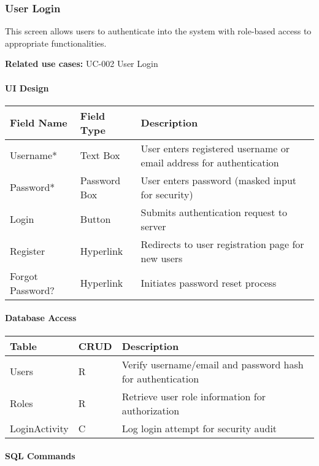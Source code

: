 \documentclass[12pt,a4paper]{article}
\begin{document}
\subsubsection{User Login}

This screen allows users to authenticate into the system with role-based access to appropriate functionalities.

\textbf{Related use cases:} UC-002 User Login

\paragraph{UI Design}

\begin{longtable}{|p{3cm}|p{3cm}|p{8cm}|}
\hline
\textbf{Field Name} & \textbf{Field Type} & \textbf{Description} \\
\hline
Username* & Text Box & User enters registered username or email address for authentication \\
\hline
Password* & Password Box & User enters password (masked input for security) \\
\hline
Login & Button & Submits authentication request to server \\
\hline
Register & Hyperlink & Redirects to user registration page for new users \\
\hline
Forgot Password? & Hyperlink & Initiates password reset process \\
\hline
\end{longtable}

\paragraph{Database Access}

\begin{longtable}{|p{3cm}|p{2cm}|p{9cm}|}
\hline
\textbf{Table} & \textbf{CRUD} & \textbf{Description} \\
\hline
Users & R & Verify username/email and password hash for authentication \\
\hline
Roles & R & Retrieve user role information for authorization \\
\hline
LoginActivity & C & Log login attempt for security audit \\
\hline
\end{longtable}

\paragraph{SQL Commands}
\end{document}
